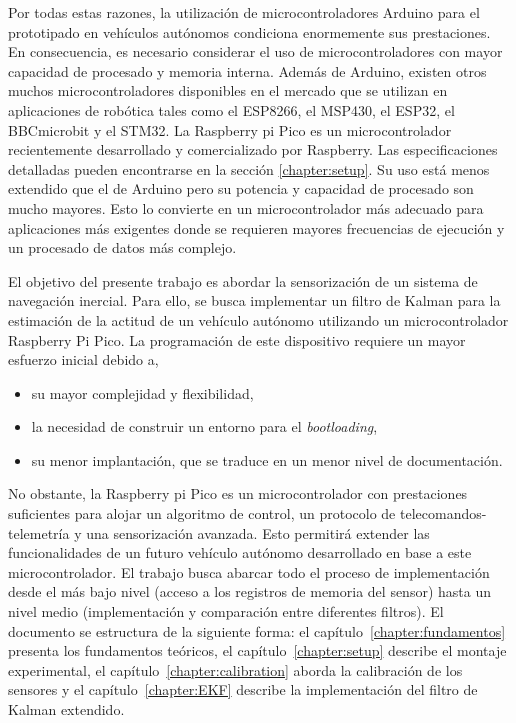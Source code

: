 \documentclass[a4paper,12pt]{book}
\begin{document}
Por todas estas razones, la utilización de microcontroladores Arduino para el prototipado en vehículos autónomos condiciona enormemente sus prestaciones. En consecuencia, es necesario considerar el uso de microcontroladores con mayor capacidad de procesado y memoria interna. Además de Arduino, existen otros muchos microcontroladores disponibles en el mercado que se utilizan en aplicaciones de robótica tales como el ESP8266, el MSP430, el ESP32, el BBCmicrobit y el STM32. La Raspberry pi Pico es un microcontrolador recientemente desarrollado y comercializado por Raspberry. Las especificaciones detalladas pueden encontrarse en la sección \ref{chapter:setup}. Su uso está menos extendido que el de Arduino pero su potencia y capacidad de procesado son mucho mayores. Esto lo convierte en un microcontrolador más adecuado para aplicaciones más exigentes donde se requieren mayores frecuencias de ejecución y un procesado de datos más complejo.



El objetivo del presente trabajo es abordar la sensorización de un sistema de navegación inercial. Para ello, se busca implementar un filtro de Kalman para la estimación de la actitud de un vehículo autónomo utilizando un microcontrolador Raspberry Pi Pico. La programación de este dispositivo requiere un mayor esfuerzo inicial debido a,
\begin{itemize}
    \item su mayor complejidad y flexibilidad,
    \item la necesidad de construir un entorno para el \emph{bootloading},
    \item su menor implantación, que se traduce en un menor nivel de documentación.
\end{itemize}
No obstante, la Raspberry pi Pico es un microcontrolador con prestaciones suficientes para alojar un algoritmo de control, un protocolo de telecomandos-telemetría y una sensorización avanzada. Esto permitirá extender las funcionalidades de un futuro vehículo autónomo desarrollado en base a este microcontrolador. El trabajo busca abarcar todo el proceso de implementación desde el más bajo nivel (acceso a los registros de memoria del sensor) hasta un nivel medio (implementación y comparación entre diferentes filtros). El documento se estructura de la siguiente forma: el capítulo~\ref{chapter:fundamentos} presenta los fundamentos teóricos, el capítulo~\ref{chapter:setup} describe el montaje experimental, el capítulo~\ref{chapter:calibration} aborda la calibración de los sensores y el capítulo~\ref{chapter:EKF} describe la implementación del filtro de Kalman extendido.
\end{document}
